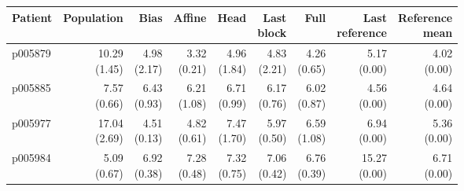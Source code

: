 \documentclass[11pt]{article}
\begin{document}
\begin{table}[!htbp]\centering\scriptsize\setlength{\tabcolsep}{3pt}
\begin{tabular}{lrrrrrrrr}\toprule
Patient & Population & Bias & Affine & Head & \shortstack{Last\\block} & Full & \shortstack{Last\\reference} & \shortstack{Reference\\mean}\\\midrule
p005879 & \shortstack{10.29\\(1.45)} & \shortstack{4.98\\(2.17)} & \shortstack{3.32\\(0.21)} & \shortstack{4.96\\(1.84)} & \shortstack{4.83\\(2.21)} & \shortstack{4.26\\(0.65)} & \shortstack{5.17\\(0.00)} & \shortstack{4.02\\(0.00)}\\
p005885 & \shortstack{7.57\\(0.66)} & \shortstack{6.43\\(0.93)} & \shortstack{6.21\\(1.08)} & \shortstack{6.71\\(0.99)} & \shortstack{6.17\\(0.76)} & \shortstack{6.02\\(0.87)} & \shortstack{4.56\\(0.00)} & \shortstack{4.64\\(0.00)}\\
p005977 & \shortstack{17.04\\(2.69)} & \shortstack{4.51\\(0.13)} & \shortstack{4.82\\(0.61)} & \shortstack{7.47\\(1.70)} & \shortstack{5.97\\(0.50)} & \shortstack{6.59\\(1.08)} & \shortstack{6.94\\(0.00)} & \shortstack{5.36\\(0.00)}\\
p005984 & \shortstack{5.09\\(0.67)} & \shortstack{6.92\\(0.38)} & \shortstack{7.28\\(0.48)} & \shortstack{7.32\\(0.75)} & \shortstack{7.06\\(0.42)} & \shortstack{6.76\\(0.39)} & \shortstack{15.27\\(0.00)} & \shortstack{6.71\\(0.00)}\\

\end{tabular}
\end{table}
\end{document}
